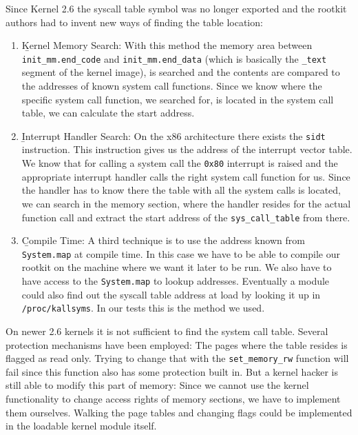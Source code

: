 Since Kernel 2.6 the syscall table symbol was no longer exported and the rootkit authors had to invent new ways 
of finding the table location:

\begin{enumerate}
	\item {\b Kernel Memory Search}: With this method the memory area between \texttt{init\_mm.end\_code} and 
		\texttt{init\_mm.end\_data} (which is basically the \texttt{\_text} segment of the kernel image), 
		is searched and the contents are compared to the addresses of known system call functions. 
		Since we know where the specific system call function, we searched for, is located in the system call table, 
		we can calculate the start address.

	\item {\b Interrupt Handler Search}: On the x86 architecture there exists the \texttt{sidt} instruction. 
		This instruction gives us the address of the interrupt vector table. We know that for calling a system call 
		the \texttt{0x80} interrupt is raised and the appropriate interrupt handler calls the right system call 
		function for us. Since the handler has to know there the table with all the system calls is located, 
		we can search in the memory section, where the handler resides for the actual function call and extract 
		the start address of the \texttt{sys\_call\_table} from there.

	\item {\b Compile Time}: A third technique is to use the address known from \texttt{System.map} at compile time. 
		In this case we have to be able to compile our rootkit on the machine where we want it later to be run. 
		We also have to have access to the \texttt{System.map} to lookup addresses. Eventually a module
		could also find out the syscall table address at load by looking it up in \texttt{/proc/kallsyms}.
		In our tests this is the method we used.
\end{enumerate}

On newer 2.6 kernels it is not sufficient to find the system call table. Several protection mechanisms have been employed: 
The pages where the table resides is flagged as read only. 
Trying to change that with the \texttt{set\_memory\_rw} function will fail since this function also has some 
protection built in. But a kernel hacker is still able to modify this part 
of memory: Since we cannot use the kernel functionality to change access rights of memory sections, we have to implement 
them ourselves. Walking the page tables and changing flags could be implemented in the loadable kernel module itself.

